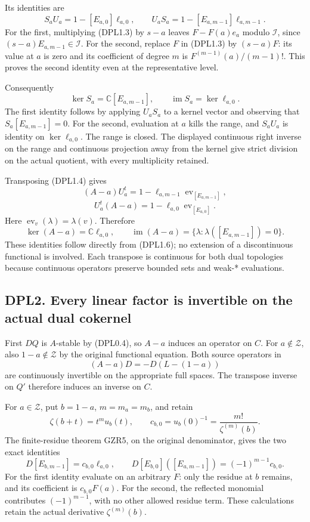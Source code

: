 Its identities are \[
S_aU_a=1-[E_{a,0}]\ell_{a,0},\qquad
U_aS_a=1-[E_{a,m-1}]\ell_{a,m-1}.
\tag{DPL1.4}
\] For the first, multiplying (DPL1.3) by \(s-a\) leaves \(F-F(a)e_a\)
modulo \(\mathcal I\), since \((s-a)E_{a,m-1}\in\mathcal I\). For the
second, replace \(F\) in (DPL1.3) by \((s-a)F\): its value at \(a\) is
zero and its coefficient of degree \(m\) is \(F^{(m-1)}(a)/(m-1)!\).
This proves the second identity even at the representative level.

Consequently \[
\ker S_a=\mathbb C[E_{a,m-1}],\qquad
\operatorname{im}S_a=\ker\ell_{a,0}.
\tag{DPL1.5}
\] The first identity follows by applying \(U_aS_a\) to a kernel vector
and observing that \(S_a[E_{a,m-1}]=0\). For the second, evaluation at
\(a\) kills the range, and \(S_aU_a\) is identity on \(\ker\ell_{a,0}\).
The range is closed. The displayed continuous right inverse on the range
and continuous projection away from the kernel give strict division on
the actual quotient, with every multiplicity retained.

Transposing (DPL1.4) gives \[
(A-a)U_a^t
=1-\ell_{a,m-1}\operatorname{ev}_{[E_{a,m-1}]},
\] \[
U_a^t(A-a)
=1-\ell_{a,0}\operatorname{ev}_{[E_{a,0}]}.
\tag{DPL1.6}
\] Here \(\operatorname{ev}_v(\lambda)=\lambda(v)\). Therefore \[
\ker(A-a)=\mathbb C\ell_{a,0},\qquad
\operatorname{im}(A-a)=\{\lambda:\lambda([E_{a,m-1}])=0\}.
\tag{DPL1.7}
\] These identities follow directly from (DPL1.6); no extension of a
discontinuous functional is involved. Each transpose is continuous for
both dual topologies because continuous operators preserve bounded sets
and weak-* evaluations.

\subsection{DPL2. Every linear factor is invertible on the actual dual
cokernel}\label{dpl2.-every-linear-factor-is-invertible-on-the-actual-dual-cokernel}

First \(DQ\) is \(A\)-stable by (DPL0.4), so \(A-a\) induces an operator
on \(C\). For \(a\notin\mathscr Z\), also \(1-a\notin\mathscr Z\) by the
original functional equation. Both source operators in \[
(A-a)D=-D(L-(1-a))
\tag{DPL2.1}
\] are continuously invertible on the appropriate full spaces. The
transpose inverse on \(Q'\) therefore induces an inverse on \(C\).

For \(a\in\mathscr Z\), put \(b=1-a\), \(m=m_a=m_b\), and retain \[
\zeta(b+t)=t^mu_b(t),\qquad
c_{b,0}=u_b(0)^{-1}=\frac{m!}{\zeta^{(m)}(b)}.
\tag{DPL2.2}
\] The finite-residue theorem GZR5, on the original denominator, gives
the two exact identities \[
D[E_{b,m-1}]=c_{b,0}\ell_{a,0},
\qquad
D[E_{b,0}]([E_{a,m-1}])=(-1)^{m-1}c_{b,0}.
\tag{DPL2.3}
\] For the first identity evaluate on an arbitrary \(F\): only the
residue at \(b\) remains, and its coefficient is \(c_{b,0}F(a)\). For
the second, the reflected monomial contributes \((-1)^{m-1}\), with no
other allowed residue term. These calculations retain the actual
derivative \(\zeta^{(m)}(b)\).

